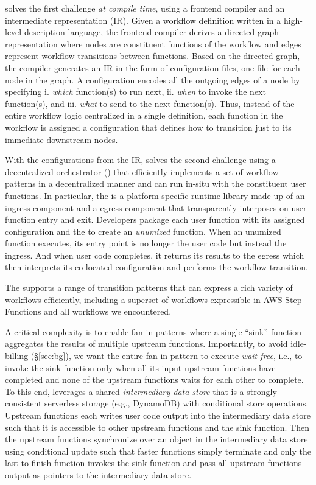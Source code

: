\name{} solves the first challenge \emph{at compile time}, using a frontend
compiler and an intermediate representation (IR). Given a workflow definition
written in a high-level description language, the frontend compiler derives a
directed graph representation where nodes are constituent functions of the
workflow and edges represent workflow transitions between
functions. Based on the directed graph, the compiler generates an IR in
the form of configuration files, one file for each node in the graph. A
\name{} configuration encodes all the outgoing edges of a node by specifying
i. \emph{which} function(s) to run next, ii. \emph{when} to invoke the next
function(s), and iii. \emph{what} to send to the next function(s). Thus,
instead of the entire workflow logic centralized in a single definition, each
function in the workflow is assigned a configuration that defines how to
transition just to its immediate downstream nodes.

With the configurations from the IR, \name{} solves the second challenge using
a decentralized orchestrator (\deorc) that efficiently implements a set of
workflow patterns in a decentralized manner and can run in-situ with the
constituent user functions. In particular, the \deorc{} is a platform-specific
runtime library made up of an ingress component and a egress component that
transparently interposes on user function entry and exit. Developers package
each user function with its assigned \name{} configuration and the \deorc{} to
create an \emph{unumized} function. When an unumized function executes, its
entry point is no longer the user code but instead the \deorc{} ingress. And
when user code completes, it returns its results to the \deorc{} egress which
then interprets its co-located \name{} configuration and performs the workflow
transition.

The \name{} \deorc{} supports a range of transition patterns that can express
a rich variety of workflows efficiently, including a superset of workflows
expressible in AWS Step Functions and all workflows we encountered.

A critical complexity is to enable fan-in patterns where a single ``sink''
function aggregates the results of multiple upstream functions. Importantly,
to avoid idle-billing (\S\ref{sec:bg}), we want the entire fan-in pattern to
execute \emph{wait-free}, i.e., to invoke the sink function only when all its
input upstream functions have completed and none of the upstream functions
waits for each other to complete. To this end, \name{} leverages a shared
\emph{intermediary data store} that is a strongly consistent serverless
storage (e.g., DynamoDB) with conditional store operations. Upstream functions
each writes user code output into the intermediary data store such that it is
accessible to other upstream functions and the sink function. Then the
upstream functions synchronize over an object in the intermediary data store
using conditional update such that faster functions simply terminate and only
the last-to-finish function invokes the sink function and pass all upstream
functions output as pointers to the intermediary data store.

